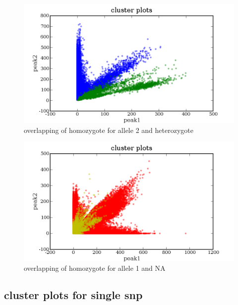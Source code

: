\documentclass[a4paper,10pt]{article}
\begin{document}
\begin{figure}
\includegraphics[width=1\textwidth]{figures/cluster_plots_allele2_het.png}
\caption{overlapping of homozygote for allele 2 and heterozygote}\label{f6}
\end{figure}

\begin{figure}
\includegraphics[width=1\textwidth]{figures/cluster_plots_allele1_NA.png}
\caption{overlapping of homozygote for allele 1 and NA}\label{f7}
\end{figure}

\subsection{cluster plots for single snp}


\end{document}
